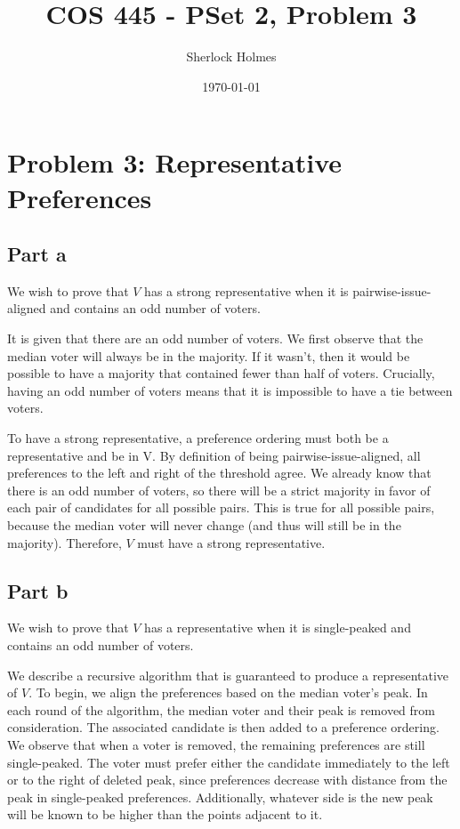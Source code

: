 \documentclass[12pt]{article}%
\begin{document}
\title{COS 445 - PSet 2, Problem 3} %
\author{Sherlock Holmes} %
\date{\today}
\maketitle
\section*{Problem 3: Representative Preferences}
\subsection*{Part a}
We wish to prove that $V$ has a strong representative when it is pairwise-issue-aligned and contains an odd number of voters.

It is given that there are an odd number of voters. We first observe that the median voter will always be in the majority. If it wasn't, then it would be possible to have a majority that contained fewer than half of voters. Crucially, having an odd number of voters means that it is impossible to have a tie between voters.

To have a strong representative, a preference ordering must both be a representative and be in V. By definition of being pairwise-issue-aligned, all preferences to the left and right of the threshold agree. We already know that there is an odd number of voters, so there will be a strict majority in favor of each pair of candidates for all possible pairs. This is true for all possible pairs, because the median voter will never change (and thus will still be in the majority). Therefore, $V$ must have a strong representative.

\subsection*{Part b}
We wish to prove that $V$ has a representative when it is single-peaked and contains an odd number of voters.

We describe a recursive algorithm that is guaranteed to produce a representative of $V$. To begin, we align the preferences based on the median voter's peak. In each round of the algorithm, the median voter and their peak is removed from consideration. The associated candidate is then added to a preference ordering. We observe that when a voter is removed, the remaining preferences are still single-peaked. The voter must prefer either the candidate immediately to the left or to the right of deleted peak, since preferences decrease with distance from the peak in single-peaked preferences. Additionally, whatever side is the new peak will be known to be higher than the points adjacent to it.
\end{document}
